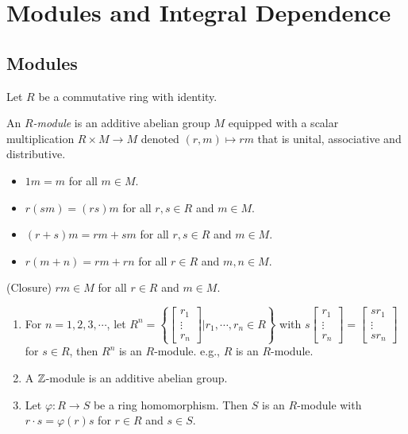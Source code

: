 \chapter{Modules and Integral Dependence}

\section*{Modules}

Let $R$ be a commutative ring with identity.

\begin{definition}\label{5.1}
    An \emph{$R$-module} is an additive abelian group $M$ equipped with a scalar multiplication $R \times M \to M$ denoted $(r,m) \mapsto rm$ that is unital, associative and distributive.
    \begin{itemize}
        \item $1m = m$ for all $m \in M$.
        \item $r(sm) = (rs)m$ for all $r,s \in R$ and $m \in M$.
        \item $(r+s)m = rm + sm$ for all $r,s \in R$ and $m \in M$.
        \item $r(m+n) = rm + rn$ for all $r \in R$ and $m,n \in M$.
    \end{itemize}
    \quad (Closure) $rm \in M$ for all $r \in R$ and $m \in M$. 
\end{definition}

\begin{example}\label{5.2}
    \begin{enumerate}
        \item 
            For $n = 1,2,3,\cdots$, let $R^{n} = \left\{\begin{bmatrix}r_1 \\ \vdots \\ r_n\end{bmatrix}\mathrel{\Bigg |} r_1,\cdots,r_n \in R\right\}$ with $s \begin{bmatrix}r_1 \\ \vdots \\ r_n\end{bmatrix} = \begin{bmatrix}sr_1 \\ \vdots \\ sr_n\end{bmatrix}$ for $s \in R$, then $R^{n}$ is an $R$-module. e.g., $R$ is an $R$-module.
        \item A $\mathbb{Z}$-module is an additive abelian group.
        \item Let $\varphi: R \to S$ be a ring homomorphism. Then $S$ is an $R$-module with $r \cdot s = \varphi(r)s$ for $r \in R$ and $s \in S$.
    \end{enumerate}
\end{example}

